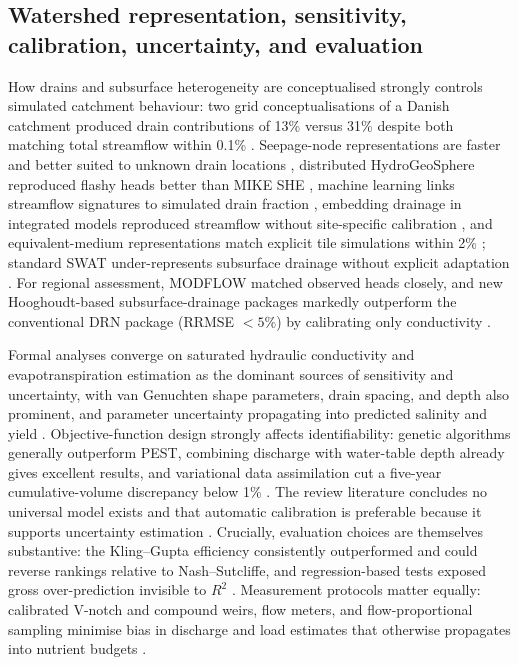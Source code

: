\documentclass[11pt]{article}
\begin{document}
\subsection{Watershed representation, sensitivity, calibration, uncertainty, and evaluation}

How drains and subsurface heterogeneity are conceptualised strongly controls
simulated catchment behaviour: two grid conceptualisations of a Danish
catchment produced drain contributions of 13\% versus 31\% despite both
matching total streamflow within 0.1\% \parencite{Karan2021}. Seepage-node
representations are faster and better suited to unknown drain locations
\parencite{Boico2022}, distributed HydroGeoSphere reproduced flashy heads
better than MIKE SHE \parencite{DeSchepper2017}, machine learning links
streamflow signatures to simulated drain fraction \parencite{Schneider2022},
embedding drainage in integrated models reproduced streamflow without
site-specific calibration \parencite{Rathore2024,Muma2016}, and equivalent-medium
representations match explicit tile simulations within 2\%
\parencite{Thomas2016}; standard SWAT under-represents subsurface drainage
without explicit adaptation \parencite{Manguerra1998,Golmohammadi2016,Rahman2014}.
For regional assessment, MODFLOW matched observed heads closely, and new
Hooghoudt-based subsurface-drainage packages markedly outperform the
conventional DRN package (RRMSE $<5\%$) by calibrating only conductivity
\parencite{Mirlas2012,Ghorbani2016,Yang2022b,Han2025,Qian2025b}.

Formal analyses converge on saturated hydraulic conductivity and
evapotranspiration estimation as the dominant sources of sensitivity and
uncertainty, with van Genuchten shape parameters, drain spacing, and depth
also prominent, and parameter uncertainty propagating into predicted salinity
and yield
\parencite{NabiSichani2012,Malakshahi2020,Wang2006,Sedaghatdoost2018,Timalsina2023,Alzraiee2013}.
Objective-function design strongly affects identifiability: genetic algorithms
generally outperform PEST, combining discharge with water-table depth already
gives excellent results, and variational data assimilation cut a five-year
cumulative-volume discrepancy below 1\%
\parencite{Sedaghatdoost2019,Chelil2022b,Schoups2005}. The review literature
concludes no universal model exists and that automatic calibration is
preferable because it supports uncertainty estimation \parencite{Singh2019b}.
Crucially, evaluation choices are themselves substantive: the Kling--Gupta
efficiency consistently outperformed and could reverse rankings relative to
Nash--Sutcliffe, and regression-based tests exposed gross over-prediction
invisible to $R^2$
\parencite{Bruhn2025,STONE1995,SAVABI1995,Wessel2022}. Measurement protocols
matter equally: calibrated V-notch and compound weirs, flow meters, and
flow-proportional sampling minimise bias in discharge and load estimates that
otherwise propagates into nutrient budgets
\parencite{Christianson2019,BinShokrana2021,Napierala2023,Katuwal2024,Enamorado2007,Dialameh2022,Young2023}.
\end{document}
